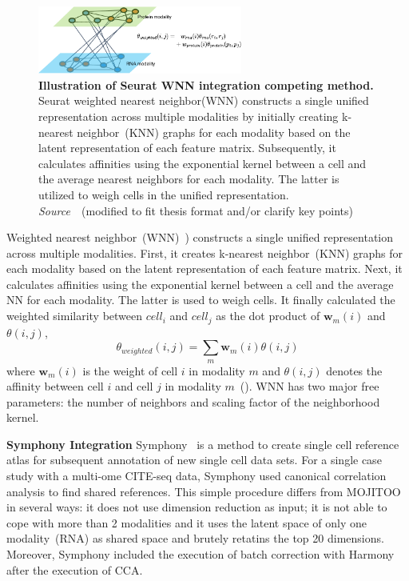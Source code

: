 \begin{description}
\begin{figure}[!h]
  	\centering
  	\includegraphics[width=0.60\textwidth]{Alg_WNN/fig}
  	\vspace{0.1cm}
  	\caption[Illustration of Seurat WNN integration competing method.]{\textbf{Illustration of Seurat WNN integration competing method.} Seurat weighted nearest neighbor(WNN) constructs a single unified representation across multiple modalities by initially creating k-nearest neighbor~(KNN) graphs for each modality based on the latent representation of each feature matrix. Subsequently, it calculates affinities using the exponential kernel between a cell and the average nearest neighbors for each modality. The latter is utilized to weigh cells in the unified representation. \emph{Source~\cite{hao2021seurat4}}~(modified to fit thesis format and/or clarify key points)
  }
  	\label{fig:Alg_WNN}
\end{figure}

  \item[Seurat WNN]
  Weighted nearest neighbor~(WNN)~\citep{hao2021seurat4}) constructs a single unified representation across multiple modalities. First, it creates k-nearest neighbor~(KNN) graphs for each modality based on the latent representation of each feature matrix. Next, it calculates affinities using the exponential kernel between a cell and the average NN for each modality. The latter is used to weigh cells. It finally calculated the weighted similarity between $cell_i$ and $cell_j$ as the dot product of $\textbf{w}_m(i)$ and $\theta(i,j)$,
  \begin{equation}
  	\theta_{weighted}(i,j)=\sum_{m} \textbf{w}_m(i)\theta(i,j)
  \end{equation}
  where $\textbf{w}_m(i)$ is the weight of cell $i$ in modality $m$ and $\theta(i,j)$ denotes the affinity between cell $i$ and cell $j$ in modality $m$~(). WNN has two major free parameters: the number of neighbors and scaling factor of the neighborhood kernel.


  \item \textbf{Symphony Integration}
  Symphony~\citep{kang2021symphony} is a method to create single cell reference atlas for subsequent annotation of new single cell data sets. For a single case study with a multi-ome CITE-seq data, Symphony used canonical correlation analysis to find shared references. This simple procedure differs from MOJITOO in several ways: it does not use dimension reduction as input; it is not able to cope with more than 2 modalities and it uses the latent space of only one modality~(RNA) as shared space and brutely retatins the top 20 dimensions. Moreover, Symphony included the execution of batch correction with Harmony after the execution of CCA.
\end{description}


